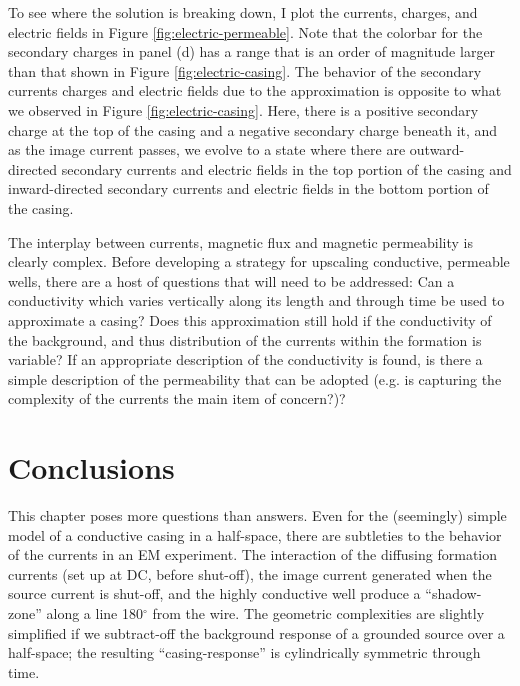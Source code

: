 




To see where the solution is breaking down, I plot the currents, charges, and electric fields in Figure \ref{fig:electric-permeable}. Note that the colorbar for the secondary charges in panel (d) has a range that is an order of magnitude larger than that shown in Figure \ref{fig:electric-casing}. The behavior of the secondary currents charges and electric fields  due to the approximation is opposite to what we observed in Figure \ref{fig:electric-casing}. Here, there is a positive secondary charge at the top of the casing and a negative secondary charge beneath it, and as the image current passes, we evolve to a state where there  are outward-directed secondary currents and electric fields in the top portion of the casing and inward-directed secondary currents and electric fields in the bottom portion of the casing.




The interplay between currents, magnetic flux and magnetic permeability is clearly complex. Before developing a strategy for upscaling conductive, permeable wells, there are a host of questions that will need to be addressed: Can a conductivity which varies vertically along its length and through time be used to approximate a casing? Does this approximation still hold if the conductivity of the background, and thus distribution of the currents within the formation is variable? If an appropriate description of the conductivity is found, is there a simple description of the permeability that can be adopted (e.g. is capturing the complexity of the currents the main item of concern?)?

\section{Conclusions}
This chapter poses more questions than answers. Even for the (seemingly) simple model of a conductive casing in a half-space, there are subtleties to the behavior of the currents in an EM experiment. The interaction of the diffusing formation currents (set up at DC, before shut-off), the image current generated when the source current is shut-off, and the highly conductive well produce a ``shadow-zone'' along a line 180$^\circ$ from the wire. The geometric complexities are slightly simplified if we subtract-off the background response of a grounded source over a half-space; the resulting ``casing-response'' is cylindrically symmetric through time.

